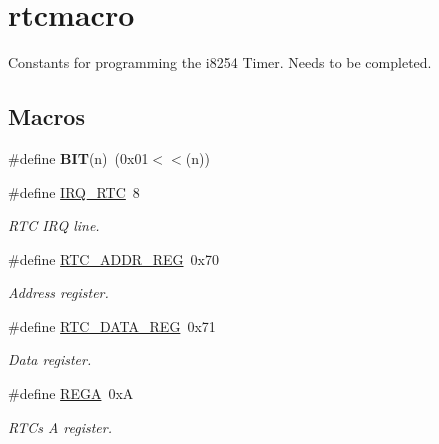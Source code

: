 \hypertarget{group__rtcmacro}{}\section{rtcmacro}
\label{group__rtcmacro}


Constants for programming the i8254 Timer. Needs to be completed.  


\subsection*{Macros}
\begin{DoxyCompactItemize}
\item 
\hypertarget{group__rtcmacro_ga3a8ea58898cb58fc96013383d39f482c}{}\label{group__rtcmacro_ga3a8ea58898cb58fc96013383d39f482c} 
\#define {\bfseries B\+IT}(n)~(0x01$<$$<$(n))
\item 
\hypertarget{group__rtcmacro_ga910ac5f2c1b4016e433f9832358a1816}{}\label{group__rtcmacro_ga910ac5f2c1b4016e433f9832358a1816} 
\#define \hyperlink{group__rtcmacro_ga910ac5f2c1b4016e433f9832358a1816}{I\+R\+Q\+\_\+\+R\+TC}~8
\begin{DoxyCompactList}\small\item\em R\+TC I\+RQ line. \end{DoxyCompactList}\item 
\hypertarget{group__rtcmacro_ga710b98232df2c563009e6f8a6cd18220}{}\label{group__rtcmacro_ga710b98232df2c563009e6f8a6cd18220} 
\#define \hyperlink{group__rtcmacro_ga710b98232df2c563009e6f8a6cd18220}{R\+T\+C\+\_\+\+A\+D\+D\+R\+\_\+\+R\+EG}~0x70
\begin{DoxyCompactList}\small\item\em Address register. \end{DoxyCompactList}\item 
\hypertarget{group__rtcmacro_ga2f258a00c59c3f347c8d2d4a75471ce0}{}\label{group__rtcmacro_ga2f258a00c59c3f347c8d2d4a75471ce0} 
\#define \hyperlink{group__rtcmacro_ga2f258a00c59c3f347c8d2d4a75471ce0}{R\+T\+C\+\_\+\+D\+A\+T\+A\+\_\+\+R\+EG}~0x71
\begin{DoxyCompactList}\small\item\em Data register. \end{DoxyCompactList}\item 
\hypertarget{group__rtcmacro_ga871557447a6fe92581aa4905362f3526}{}\label{group__rtcmacro_ga871557447a6fe92581aa4905362f3526} 
\#define \hyperlink{group__rtcmacro_ga871557447a6fe92581aa4905362f3526}{R\+E\+GA}~0xA
\begin{DoxyCompactList}\small\item\em R\+TC\textquotesingle{}s A register. \end{DoxyCompactList}\item 
$$
\end{DoxyCompactItemize}

